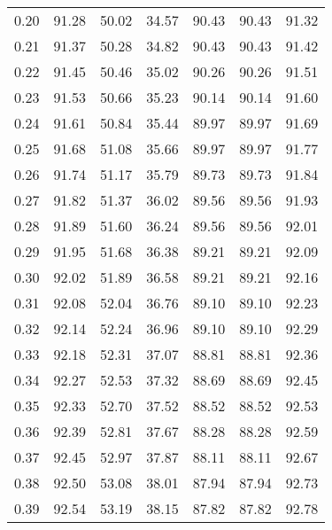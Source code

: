 \begin{tabular}{|c|c|c|c|c|c|c|}
      0.20 &     91.28 &     50.02 &      34.57 &   90.43 &      90.43 &         91.32 \\
      0.21 &     91.37 &     50.28 &      34.82 &   90.43 &      90.43 &         91.42 \\
      0.22 &     91.45 &     50.46 &      35.02 &   90.26 &      90.26 &         91.51 \\
      0.23 &     91.53 &     50.66 &      35.23 &   90.14 &      90.14 &         91.60 \\
      0.24 &     91.61 &     50.84 &      35.44 &   89.97 &      89.97 &         91.69 \\
      0.25 &     91.68 &     51.08 &      35.66 &   89.97 &      89.97 &         91.77 \\
      0.26 &     91.74 &     51.17 &      35.79 &   89.73 &      89.73 &         91.84 \\
      0.27 &     91.82 &     51.37 &      36.02 &   89.56 &      89.56 &         91.93 \\
      0.28 &     91.89 &     51.60 &      36.24 &   89.56 &      89.56 &         92.01 \\
      0.29 &     91.95 &     51.68 &      36.38 &   89.21 &      89.21 &         92.09 \\
      0.30 &     92.02 &     51.89 &      36.58 &   89.21 &      89.21 &         92.16 \\
      0.31 &     92.08 &     52.04 &      36.76 &   89.10 &      89.10 &         92.23 \\
      0.32 &     92.14 &     52.24 &      36.96 &   89.10 &      89.10 &         92.29 \\
      0.33 &     92.18 &     52.31 &      37.07 &   88.81 &      88.81 &         92.36 \\
      0.34 &     92.27 &     52.53 &      37.32 &   88.69 &      88.69 &         92.45 \\
      0.35 &     92.33 &     52.70 &      37.52 &   88.52 &      88.52 &         92.53 \\
      0.36 &     92.39 &     52.81 &      37.67 &   88.28 &      88.28 &         92.59 \\
      0.37 &     92.45 &     52.97 &      37.87 &   88.11 &      88.11 &         92.67 \\
      0.38 &     92.50 &     53.08 &      38.01 &   87.94 &      87.94 &         92.73 \\
      0.39 &     92.54 &     53.19 &      38.15 &   87.82 &      87.82 &         92.78 \\

\end{tabular}
